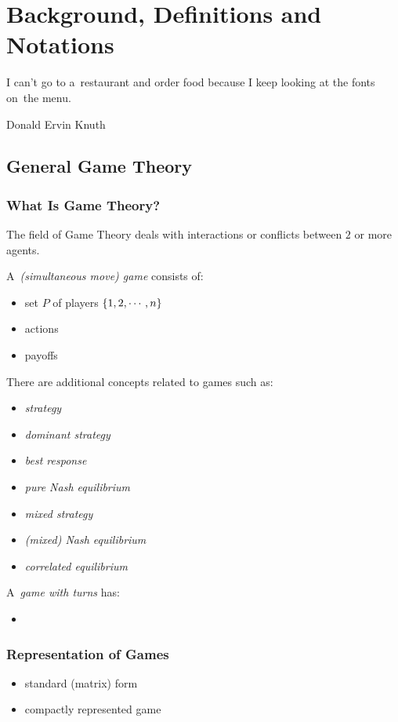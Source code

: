 \chapter{Background, Definitions and Notations}
\epigraph{
  I can't go to a~restaurant and order food because I keep looking at the fonts on~the menu.
}{Donald Ervin Knuth}

\section{General Game Theory}

\subsection{What Is Game Theory?}

The field of Game Theory deals with interactions or conflicts between $2$ or more agents.
\todo

A~\emph{(simultaneous move) game} consists of: \todo
\begin{itemize}
  \item set $P$ of players $\left\{ 1, 2, \cdots, n \right\}$
  \item actions
  \item payoffs
\end{itemize}

There are additional concepts related to games such as: \todo
\begin{itemize}
  \item \emph{strategy}
  \item \emph{dominant strategy}
  \item \emph{best response}
  \item \emph{pure Nash equilibrium}
  \item \emph{mixed strategy}
  \item \emph{(mixed) Nash equilibrium}
  \item \emph{correlated equilibrium}
\end{itemize}

A~\emph{game with turns} has:
\begin{itemize}
  \item \todo
\end{itemize}

\subsection{Representation of Games}

\todo
\begin{itemize}
  \item standard (matrix) form
  \item compactly represented game
\end{itemize}

